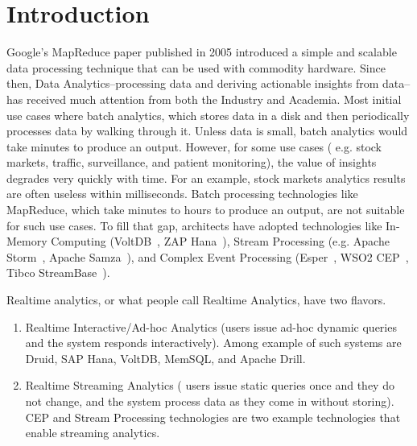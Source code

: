 \documentclass{sig-alternate}
\begin{document}





\section{Introduction}

Google's MapReduce paper published in 2005 introduced a simple and scalable data processing technique that can be used with commodity hardware. Since then, Data Analytics--processing data and deriving actionable insights from data--has received much attention from both the Industry and Academia.  Most initial use cases where batch analytics, which stores data in a disk and then periodically processes data by walking through it. Unless data is small, batch analytics would take minutes to produce an output. However, for some use cases ( e.g. stock markets, traffic, surveillance, and patient monitoring), the value of insights degrades very quickly with time. For an example, stock markets analytics results are often useless within milliseconds. Batch processing technologies like MapReduce, which take minutes to hours to produce an output, are not suitable for such use cases. To fill that gap, architects have adopted technologies like In-Memory Computing (VoltDB~\cite{voltdb}, ZAP Hana~\cite{saphana}), Stream Processing (e.g. Apache Storm~\cite{storm}, Apache Samza~\cite{samza}), and Complex Event Processing (Esper~\cite{esper}, WSO2 CEP~\cite{siddhi}, Tibco StreamBase~\cite{streambase}).

Realtime analytics, or what people call Realtime Analytics, have two flavors.  

\begin{enumerate}
\item Realtime Interactive/Ad-hoc Analytics (users issue ad-hoc dynamic queries and the system responds interactively). Among example of such systems are Druid, SAP Hana, VoltDB, MemSQL, and Apache Drill. 
\item Realtime Streaming Analytics ( users issue static queries once and they do not change, and the system process data as they come in without storing). CEP and Stream Processing technologies are two example technologies that enable streaming analytics. 
\end{enumerate}
\end{document}
